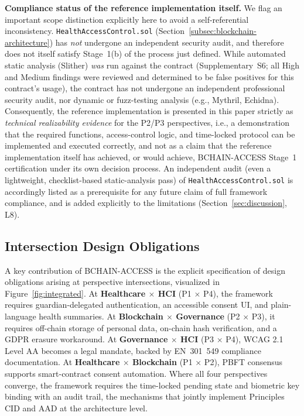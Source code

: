 \documentclass[journal,onecolumn]{IEEEtran}
\begin{document}
\textbf{Compliance status of the reference implementation itself.} We flag an important scope distinction explicitly here to avoid a self-referential inconsistency. \texttt{HealthAccessControl.sol} (Section~\ref{subsec:blockchain-architecture}) has \emph{not} undergone an independent security audit, and therefore does not itself satisfy Stage~1(b) of the process just defined. While automated static analysis (Slither) \emph{was} run against the contract (Supplementary~S6; all High and Medium findings were reviewed and determined to be false positives for this contract's usage), the contract has not undergone an independent professional security audit, nor dynamic or fuzz-testing analysis (e.g., Mythril, Echidna). Consequently, the reference implementation is presented in this paper strictly as \emph{technical realizability evidence} for the P2/P3 perspectives, i.e., a demonstration that the required functions, access-control logic, and time-locked protocol can be implemented and executed correctly, and not as a claim that the reference implementation itself has achieved, or would achieve, BCHAIN-ACCESS Stage~1 certification under its own decision process. An independent audit (even a lightweight, checklist-based static-analysis pass) of \texttt{HealthAccessControl.sol} is accordingly listed as a prerequisite for any future claim of full framework compliance, and is added explicitly to the limitations (Section~\ref{sec:discussion}, L8).

\subsection{Intersection Design Obligations}
\label{subsec:intersection}

A key contribution of BCHAIN-ACCESS is the explicit specification of design obligations arising at perspective intersections, visualized in Figure~\ref{fig:integrated}. At \textbf{Healthcare $\times$ HCI} (P1 $\times$ P4), the framework requires guardian-delegated authentication, an accessible consent UI, and plain-language health summaries. At \textbf{Blockchain $\times$ Governance} (P2 $\times$ P3), it requires off-chain storage of personal data, on-chain hash verification, and a GDPR erasure workaround. At \textbf{Governance $\times$ HCI} (P3 $\times$ P4), WCAG 2.1 Level AA becomes a legal mandate, backed by EN~301~549 compliance documentation. At \textbf{Healthcare $\times$ Blockchain} (P1 $\times$ P2), PBFT consensus supports smart-contract consent automation. Where all four perspectives converge, the framework requires the time-locked pending state and biometric key binding with an audit trail, the mechanisms that jointly implement Principles CID and AAD at the architecture level.
\end{document}
